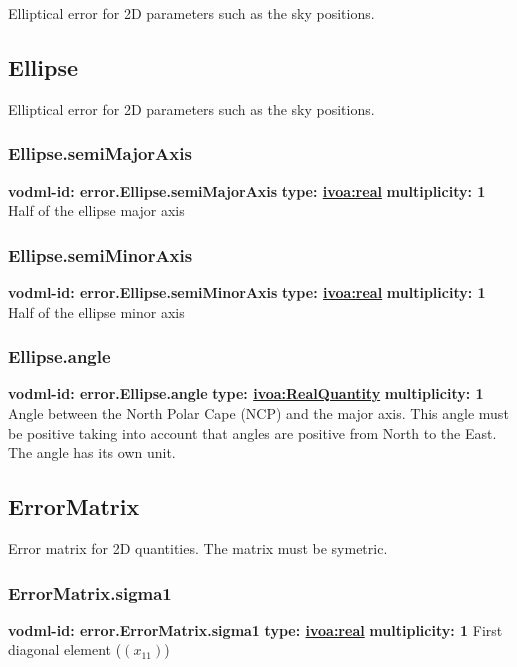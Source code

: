   Elliptical error for 2D parameters such as the sky positions.

  \subsection{Ellipse}
  \label{sect:error.Ellipse}
    Elliptical error for 2D parameters such as the sky positions.

    \subsubsection{Ellipse.semiMajorAxis}
      \textbf{vodml-id: error.Ellipse.semiMajorAxis} \newline
      \textbf{type: \hyperref[sect:ivoa]{ivoa:real}} \newline
      \textbf{multiplicity: 1} \newline 
      Half of the ellipse major axis

    \subsubsection{Ellipse.semiMinorAxis}
      \textbf{vodml-id: error.Ellipse.semiMinorAxis} \newline
      \textbf{type: \hyperref[sect:ivoa]{ivoa:real}} \newline
      \textbf{multiplicity: 1} \newline 
      Half of the ellipse minor axis

    \subsubsection{Ellipse.angle}
      \textbf{vodml-id: error.Ellipse.angle} \newline
      \textbf{type: \hyperref[sect:ivoa]{ivoa:RealQuantity}} \newline
      \textbf{multiplicity: 1} \newline 
      Angle between the North Polar Cape (NCP) and the major axis. This angle must be positive taking into account that angles are positive from North to the East. The angle has its own unit.

  \subsection{ErrorMatrix}
  \label{sect:error.ErrorMatrix}
    Error matrix for 2D quantities. The matrix must be symetric.

    \subsubsection{ErrorMatrix.sigma1}
      \textbf{vodml-id: error.ErrorMatrix.sigma1} \newline
      \textbf{type: \hyperref[sect:ivoa]{ivoa:real}} \newline
      \textbf{multiplicity: 1} \newline 
      First diagonal element ($(x_{11})$)

